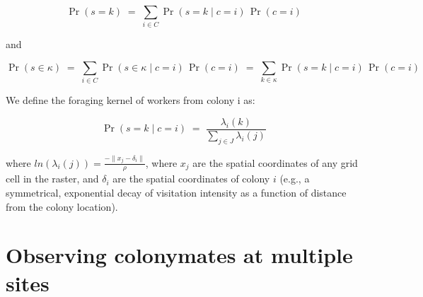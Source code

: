 \documentclass[12pt]{article}
\begin{document}
\[
\Pr(s = k) \;=\; \sum_{i \in C} \Pr(s = k \mid c = i)\,\Pr(c = i)
\]

and

\[
\Pr(s \in \kappa) \;=\; \sum_{i \in C} \Pr(s \in \kappa \mid c = i)\,\Pr(c = i)
                  \;=\; \sum_{k \in \kappa} \Pr(s = k \mid c = i)\,\Pr(c = i)
\]

We define the foraging kernel of workers from colony i as:

\[
\Pr(s = k \mid c = i)
\;=\; 
\frac{\lambda_i(k)}{\sum_{j \in J} \lambda_i(j)}
\]

where $ln(\lambda_i(j)) = \frac{- \lVert x_j - \delta_i \rVert}{\rho}$, where $x_j$ are the spatial coordinates of any grid cell in the raster, and $\delta_i$ are the spatial coordinates of colony $i$ (e.g., a symmetrical, exponential decay of visitation intensity as a function of distance from the colony location).








\section{Observing colonymates at multiple sites}
\end{document}
